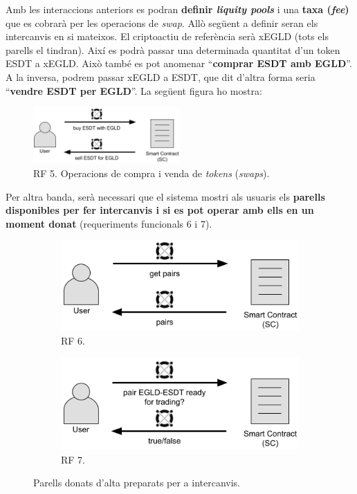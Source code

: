 \documentclass[11pt,a4paper]{article}
\begin{document}
Amb les interaccions anteriors es podran \textbf{definir \textit{liquity pools}} i una \textbf{taxa (\textit{fee})} que es cobrarà per les operacions de \textit{swap}. Allò següent a definir seran els intercanvis en si mateixos. El criptoactiu de referència serà xEGLD (tots els parells el tindran). Així es podrà passar una determinada quantitat d'un token ESDT a xEGLD. Això també es pot anomenar ``\textbf{comprar ESDT amb EGLD}''. A la inversa, podrem passar xEGLD a ESDT, que dit d'altra forma seria ``\textbf{vendre ESDT per EGLD}''. La següent figura ho mostra:
\begin{figure}[h]
\includegraphics[width=0.5\textwidth]{cu_buy_sell1.png}
\centering
\caption{RF 5. Operacions de compra i venda de \textit{tokens} (\textit{swaps}).}\label{fig:cu_buy_sell1}
\end{figure} 

Per altra banda, serà necessari que el sistema mostri als usuaris els \textbf{parells disponibles per fer intercanvis i si es pot operar amb ells en un moment donat} (requeriments funcionals 6 i 7).

\begin{figure}[!htb]
\begin{subfigure}[b]{0.49\textwidth}
  \includegraphics[width=\linewidth]{cu_get_pairs.png}
  \caption{RF 6.}\label{fig:getpairs}
\end{subfigure}\hfill
\begin{subfigure}[b]{0.49\textwidth}
  \includegraphics[width=\linewidth]{cu_status_pair.png}
  \caption{RF 7.}\label{fig:statuspair}
\end{subfigure}\hfill
\caption{Parells donats d'alta preparats per a intercanvis.}
\end{figure}
\end{document}

